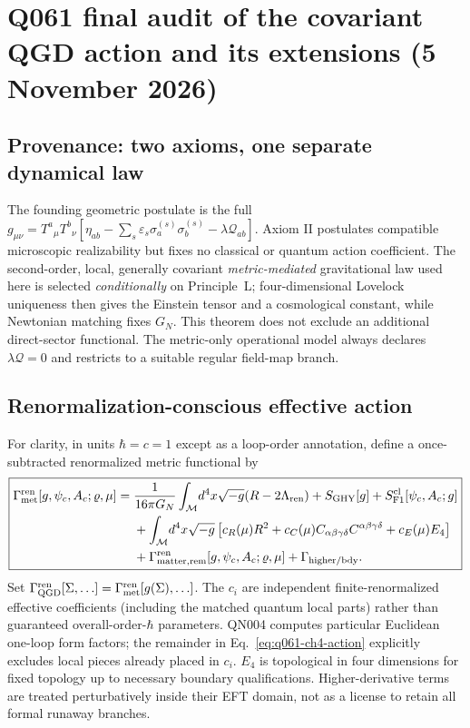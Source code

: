 \documentclass[11pt,a4paper]{article}
\begin{document}
\section{Q061 final audit of the covariant QGD action and its extensions (5 November 2026)}\label{sec:q061-action-audit}
\subsection{Provenance: two axioms, one separate dynamical law}
The founding geometric postulate is the full $g_{\mu\nu}=T^a{}_{\mu}T^b{}_{\nu}[\eta_{ab}-\sum_s\varepsilon_s\sigma_a^{(s)}\sigma_b^{(s)}-\lambda\mathcal Q_{ab}]$. Axiom II postulates compatible microscopic realizability but fixes no classical or quantum action coefficient. The second-order, local, generally covariant \emph{metric-mediated} gravitational law used here is selected \emph{conditionally} on Principle~L; four-dimensional Lovelock uniqueness then gives the Einstein tensor and a cosmological constant, while Newtonian matching fixes $G_N$. This theorem does not exclude an additional direct-sector functional. The metric-only operational model always declares $\lambda\mathcal Q=0$ and restricts to a suitable regular field-map branch.

\subsection{Renormalization-conscious effective action}
For clarity, in units $\hbar=c=1$ except as a loop-order annotation, define a once-subtracted renormalized metric functional by
\begin{equation}\label{eq:q061-ch4-action}
\boxed{\begin{aligned}
\Gamma_{\rm met}^{\rm ren}[g,\psi_c,A_c;\varrho,\mu]
={}&\frac{1}{16\pi G_N}\int_{\mathcal M}\!d^4x\sqrt{-g}(R-2\Lambda_{\rm ren})+S_{\rm GHY}[g]
+S_{\rm F1}^{\rm cl}[\psi_c,A_c;g]\\
&+\int_{\mathcal M}\!d^4x\sqrt{-g}\left[c_R(\mu)R^2+c_C(\mu)C_{\alpha\beta\gamma\delta}C^{\alpha\beta\gamma\delta}
+c_E(\mu)E_4\right]\\
&+\Gamma_{\rm matter,rem}^{\rm ren}[g,\psi_c,A_c;\varrho,\mu]
+\Gamma_{\rm higher/bdy}.
\end{aligned}}
\end{equation}
Set $\Gamma_{\rm QGD}^{\rm ren}[\Sigma,\ldots]=\Gamma_{\rm met}^{\rm ren}[g(\Sigma),\ldots]$. The $c_i$ are independent finite-renormalized effective coefficients (including the matched quantum local parts) rather than guaranteed overall-order-$\hbar$ parameters. QN004 computes particular Euclidean one-loop form factors; the remainder in Eq.~\eqref{eq:q061-ch4-action} explicitly excludes local pieces already placed in $c_i$. $E_4$ is topological in four dimensions for fixed topology up to necessary boundary qualifications. Higher-derivative terms are treated perturbatively inside their EFT domain, not as a license to retain all formal runaway branches.
\end{document}
